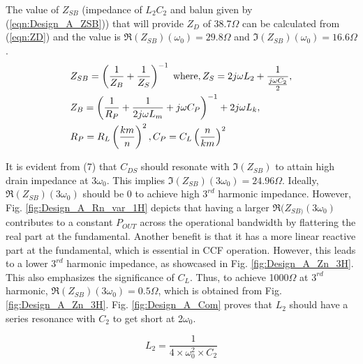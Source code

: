 \documentclass[conference]{IEEEtran}
\begin{document}
The value of $Z_{SB}$ (impedance of $L_2C_2$ and balun given by (\ref{eqn:Design_A_ZSB})) that will provide $Z_D$ of 38.7$\Omega$ can be calculated from (\ref{eqn:ZD}) and the value is $\Re(Z_{SB})(\omega_0) =  29.8\Omega$ and $\Im(Z_{SB})(\omega_0) = 16.6\Omega$.
\vspace{-0.05in}
\begin{equation}
\begin{aligned}
    &Z_{SB}=\left(\frac{1}{Z_B}+\frac{1}{Z_S}\right)^{-1}
    \hspace{1mm}\text{where}, Z_S=2j\omega  L_2+\frac{1}{\frac{j \omega C_2}{2}}, \\
    &Z_B=\left(\frac{1}{R_P}+\frac{1}{2j \omega  L_m}+j \omega C_P\right)^{-1}+2j \omega  L_k,\\ &R_P=R_L\left(\frac{km}{n}\right)^2,C_P=C_L\left(\frac{n}{km}\right)^2
\label{eqn:Design_A_ZSB}
\end{aligned}
\end{equation}

It is evident from (7) that $C_{DS}$ should resonate with $\Im(Z_{SB})$ to attain high drain impedance at $3\omega_0$. This implies $\Im(Z_{SB})(3\omega_0) = 24.96\Omega$. Ideally, $\Re(Z_{SB})(3\omega_0)$ should be 0 to achieve high $3^{rd}$ harmonic impedance. However, Fig. \ref{fig:Design_A_Rn_var_1H} depicts that having a larger $\Re(Z_{SB)}(3\omega_0)$ contributes to a constant $P_{OUT}$ across the operational bandwidth by flattering the real part at the fundamental. Another benefit is that it has a  more linear reactive part at the fundamental, which is essential in CCF operation.
However, this leads to a lower $3^{rd}$ harmonic impedance, as showcased in Fig. \ref{fig:Design_A_Zn_3H}. This also emphasizes  the significance of $C_L$. Thus, to achieve 1000$\Omega$ at $3^{rd}$ harmonic,  $\Re(Z_{SB})(3\omega_0) = 0.5\Omega$, which is obtained from Fig. \ref{fig:Design_A_Zn_3H}. Fig. \ref{fig:Design_A_Com} proves that $L_2$ should have a series resonance with $C_2$ to get short at 2$\omega_0$.

\vspace{-0.05in}
\begin{equation}
    L_2=\frac{1}{4\times\omega_0^2\times C_2}%
    \label{eqn:Design_A_2H}
\end{equation}
\end{document}
